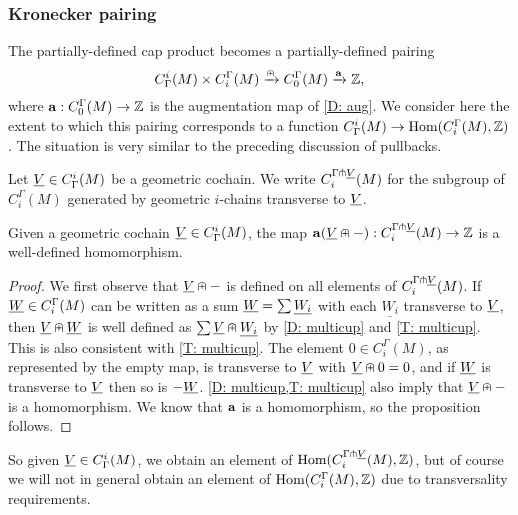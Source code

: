 \subsubsection{Kronecker pairing}

The partially-defined cap product becomes a partially-defined pairing
$$C^i_\Gamma(M) \times C_i^\Gamma(M) \xrightarrow{\nplus} C_0^\Gamma(M) \xrightarrow{\mathbf{a}}\mathbb{Z},$$
where $\mathbf{a}:C_0^\Gamma(M) \to \mathbb{Z}$ is the augmentation map of \cref{D: aug}. We consider here the extent to which this pairing corresponds to a function $C^i_\Gamma(M) \to \textup{Hom}(C_i^\Gamma(M),\mathbb{Z})$. The situation is very similar to the preceding discussion of pullbacks.



\begin{definition}\label{D: transverse to cohain}
Let $\underline{V} \in C^i_\Gamma(M)$ be a geometric cochain.
We write $C_i^{\Gamma\pitchfork \underline{V}}(M)$ for the subgroup of $C_i^\Gamma(M)$ generated by geometric $i$-chains transverse to $\underline{V}$.
\end{definition}

\begin{proposition}
Given a geometric cochain $\underline{V} \in C^i_\Gamma(M)$, the map $\mathbf{a}(\underline{V}\nplus -):C_i^{\Gamma\pitchfork \underline{V}}(M) \to \mathbb{Z}$ is a well-defined homomorphism.
\end{proposition}

\begin{proof}
We first observe that $\underline{V}\nplus -$ is defined on all elements of $C_i^{\Gamma\pitchfork \underline{V}}(M)$.
If $\underline{W} \in C_i^\Gamma(M)$ can be written as a sum $\underline{W} = \sum \underline{W_i}$ with each $\underline{W_i}$ transverse to $\underline{V}$, then $\underline{V}\nplus \underline{W}$ is well defined as $\sum \underline{V}\nplus \underline{W_i}$ by \cref{D: multicup} and \cref{T: multicup}. This is also consistent with \cref{T: multicup}. The element $0 \in C_i^\Gamma(M)$, as represented by the empty map, is transverse to $\underline{V}$ with $\underline{V}\nplus 0 = 0$, and if $\underline{W}$ is transverse to $\underline{V}$ then so is $-\underline{W}$. \cref{D: multicup,T: multicup} also imply that $\underline{V} \nplus -$ is a homomorphism. We know that $\mathbf{a}$ is a homomorphism, so the proposition follows.
\end{proof}

So given $\underline{V} \in C^i_\Gamma(M)$, we obtain an element of $\textup{Hom}(C_i^{\Gamma\pitchfork \underline{V}}(M),\mathbb{Z})$, but of course we will not in general obtain an element of $\textup{Hom}(C_i^{\Gamma}(M),\mathbb{Z})$ due to transversality requirements.



